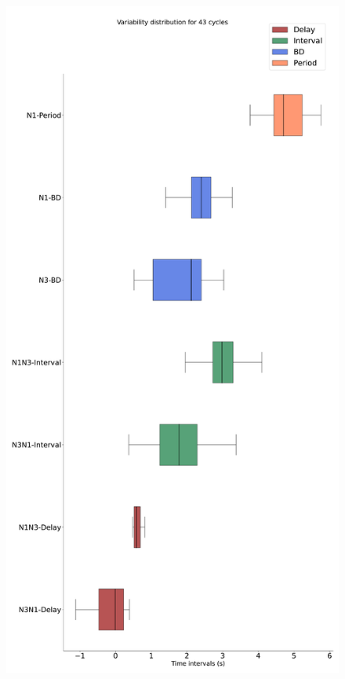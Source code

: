 \begin{figure}[htbp]
\begin{minipage}[b]{0.43\textwidth}
		\includegraphics[width=\textwidth]{./invariants/data/SUSSEX/CV1a_driven2/images/stim_cv1a2_boxplot.pdf}
	\end{minipage}
	\begin{minipage}[b]{0.55\textwidth}
		\centering

\end{minipage}
\end{figure}
